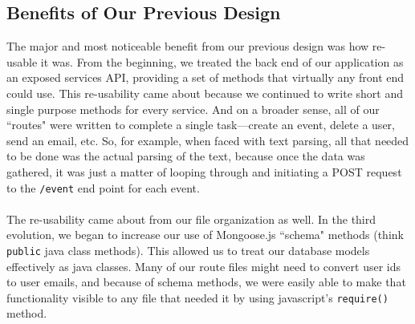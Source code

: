 \documentclass[11pt]{article}   %
\begin{document}
\subsection{Benefits of Our Previous Design}
The major and most noticeable benefit from our previous design was how re-usable it was. From the beginning, we treated the back end of our application as an exposed services API, providing a set of methods that virtually any front end could use. This re-usability came about because we continued to write short and single purpose methods for every service. And on a broader sense, all of our ``routes" were written to complete a single task---create an event, delete a user, send an email, etc. So, for example, when faced with text parsing, all that needed to be done was the actual parsing of the text, because once the data was gathered, it was just a matter of looping through and initiating a POST request to the \texttt{/event} end point for each event. \\~\\
The re-usability came about from our file organization as well. In the third evolution, we began to increase our use of Mongoose.js ``schema" methods (think \texttt{public} java class methods). This allowed us to treat our database models effectively as java classes. Many of our route files might need to convert user ids to user emails, and because of schema methods, we were easily able to make that functionality visible to any file that needed it by using javascript's \texttt{require()} method.
\end{document}
